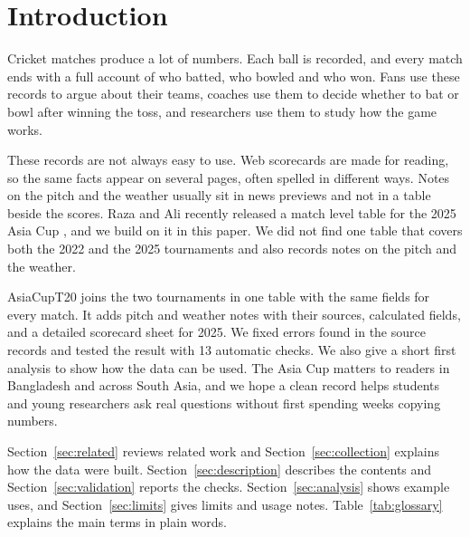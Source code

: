 \section{Introduction}
Cricket matches produce a lot of numbers. Each ball is recorded, and every match ends with a full account of who batted, who bowled and who won. Fans use these records to argue about their teams, coaches use them to decide whether to bat or bowl after winning the toss, and researchers use them to study how the game works.

These records are not always easy to use. Web scorecards are made for reading, so the same facts appear on several pages, often spelled in different ways. Notes on the pitch and the weather usually sit in news previews and not in a table beside the scores. Raza and Ali recently released a match level table for the 2025 Asia Cup \cite{razaarxiv,razadata}, and we build on it in this paper. We did not find one table that covers both the 2022 and the 2025 tournaments and also records notes on the pitch and the weather.

AsiaCupT20 joins the two tournaments in one table with the same fields for every match. It adds pitch and weather notes with their sources, calculated fields, and a detailed scorecard sheet for 2025. We fixed errors found in the source records and tested the result with 13 automatic checks. We also give a short first analysis to show how the data can be used. The Asia Cup matters to readers in Bangladesh and across South Asia, and we hope a clean record helps students and young researchers ask real questions without first spending weeks copying numbers.

Section~\ref{sec:related} reviews related work and Section~\ref{sec:collection} explains how the data were built. Section~\ref{sec:description} describes the contents and Section~\ref{sec:validation} reports the checks. Section~\ref{sec:analysis} shows example uses, and Section~\ref{sec:limits} gives limits and usage notes. Table~\ref{tab:glossary} explains the main terms in plain words.


